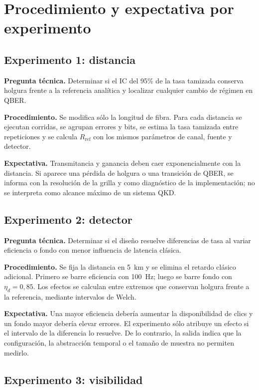\section{Procedimiento y expectativa por experimento}

\subsection{Experimento 1: distancia}

\textbf{Pregunta técnica.} Determinar si el IC del 95\% de la tasa tamizada conserva holgura frente a la referencia analítica y localizar cualquier cambio de régimen en QBER.

\textbf{Procedimiento.} Se modifica sólo la longitud de fibra. Para cada distancia se ejecutan \PThreeRepetitions{} corridas, se agrupan errores y bits, se estima la tasa tamizada entre repeticiones y se calcula \(R_\mathrm{ref}\) con los mismos parámetros de canal, fuente y detector.

\textbf{Expectativa.} Transmitancia y ganancia deben caer exponencialmente con la distancia. Si aparece una pérdida de holgura o una transición de QBER, se informa con la resolución de la grilla y como diagnóstico de la implementación; no se interpreta como alcance máximo de un sistema QKD.

\subsection{Experimento 2: detector}

\textbf{Pregunta técnica.} Determinar si el diseño resuelve diferencias de tasa al variar eficiencia o fondo con menor influencia de latencia clásica.

\textbf{Procedimiento.} Se fija la distancia en \SI{5}{\kilo\meter} y se elimina el retardo clásico adicional. Primero se barre eficiencia con \SI{100}{\hertz}; luego se barre fondo con \(\eta_d=0{,}85\). Los efectos se calculan entre extremos que conservan holgura frente a la referencia, mediante intervalos de Welch.

\textbf{Expectativa.} Una mayor eficiencia debería aumentar la disponibilidad de clics y un fondo mayor debería elevar errores. El experimento sólo atribuye un efecto si el intervalo de la diferencia lo resuelve. De lo contrario, la salida indica que la configuración, la abstracción temporal o el tamaño de muestra no permiten medirlo.

\subsection{Experimento 3: visibilidad}

